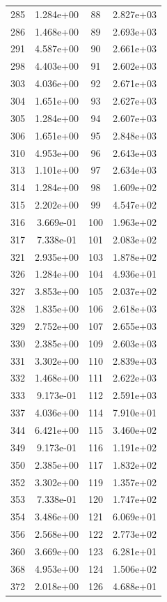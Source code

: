 \documentclass[12pt]{article}
\begin{document}
\begin{longtable}{@{}cccc@{}}
285 & 1.284e+00 & 88 & 2.827e+03 \\
286 & 1.468e+00 & 89 & 2.693e+03 \\
291 & 4.587e+00 & 90 & 2.661e+03 \\
298 & 4.403e+00 & 91 & 2.602e+03 \\
303 & 4.036e+00 & 92 & 2.671e+03 \\
304 & 1.651e+00 & 93 & 2.627e+03 \\
305 & 1.284e+00 & 94 & 2.607e+03 \\
306 & 1.651e+00 & 95 & 2.848e+03 \\
310 & 4.953e+00 & 96 & 2.643e+03 \\
313 & 1.101e+00 & 97 & 2.634e+03 \\
314 & 1.284e+00 & 98 & 1.609e+02 \\
315 & 2.202e+00 & 99 & 4.547e+02 \\
316 & 3.669e-01 & 100 & 1.963e+02 \\
317 & 7.338e-01 & 101 & 2.083e+02 \\
321 & 2.935e+00 & 103 & 1.878e+02 \\
326 & 1.284e+00 & 104 & 4.936e+01 \\
327 & 3.853e+00 & 105 & 2.037e+02 \\
328 & 1.835e+00 & 106 & 2.618e+03 \\
329 & 2.752e+00 & 107 & 2.655e+03 \\
330 & 2.385e+00 & 109 & 2.603e+03 \\
331 & 3.302e+00 & 110 & 2.839e+03 \\
332 & 1.468e+00 & 111 & 2.622e+03 \\
333 & 9.173e-01 & 112 & 2.591e+03 \\
337 & 4.036e+00 & 114 & 7.910e+01 \\
344 & 6.421e+00 & 115 & 3.460e+02 \\
349 & 9.173e-01 & 116 & 1.191e+02 \\
350 & 2.385e+00 & 117 & 1.832e+02 \\
352 & 3.302e+00 & 119 & 1.357e+02 \\
353 & 7.338e-01 & 120 & 1.747e+02 \\
354 & 3.486e+00 & 121 & 6.069e+01 \\
356 & 2.568e+00 & 122 & 2.773e+02 \\
360 & 3.669e+00 & 123 & 6.281e+01 \\
368 & 4.953e+00 & 124 & 1.506e+02 \\
372 & 2.018e+00 & 126 & 4.688e+01 \\

\end{longtable}
\end{document}
